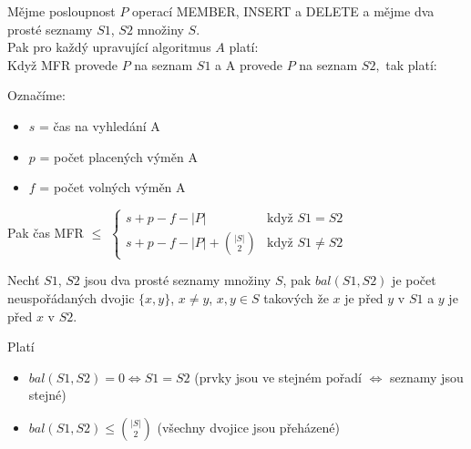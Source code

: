 \begin{theorem}
\label{theor:samoop.MFRtime}
Mějme posloupnost $P$ operací MEMBER, INSERT a DELETE a mějme dva
prosté seznamy $S1$, $S2$ množiny $S$. \\
Pak pro každý upravující algoritmus $A$ platí:\\
Když MFR provede $P$ na seznam $S1$ a A provede $P$ na seznam $S2,$ 
tak platí:
\par

Označíme:
\begin{itemize}
\item $s$ = čas na vyhledání A
\item $p$ = počet placených výměn A
\item $f$ = počet volných výměn A
\end{itemize}

Pak čas MFR $\leq$ 
\(
  \begin{cases}
  s + p - f - |P| 
  	& \text{když } S1 = S2 \\

  s+ p - f - |P| + \binom{|S|}{2}
  	& \text{když } S1 \neq S2 
 \end{cases}
\)

\end{theorem}

\begin{defn}
Nechť $S1$, $S2$ jsou dva prosté seznamy množiny $S$, pak $bal(S1,S2)$ je
počet neuspořádaných dvojic $\{x,y\}$, $x \neq y$, $x,y \in S$ takových že 
$x$ je před $y$ v $S1$ a $y$ je před $x$ v $S2$.
\end{defn}

\begin{pozn}
Platí \\
\begin{itemize}
\item $bal(S1,S2) = 0 \Leftrightarrow S1 = S2$ (prvky jsou ve stejném
	pořadí $\Leftrightarrow$ seznamy jsou stejné)
\item $bal(S1,S2) \leq \binom{|S|}{2}$ (všechny dvojice jsou přeházené)
\end{itemize}
\end{pozn}

